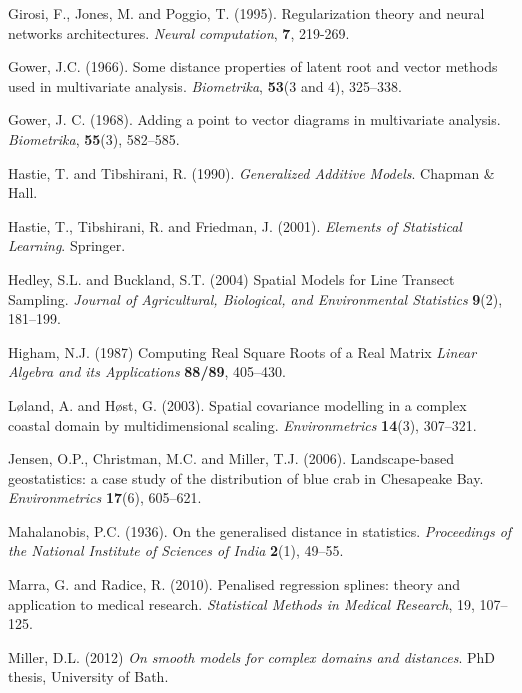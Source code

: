 \documentclass[useAMS, referee]{biom}
\begin{document}
\begin{thebibliography}{99}
\bibitem{} Girosi, F., Jones, M. and Poggio, T. (1995). Regularization theory and neural networks architectures. \textit{Neural computation}, \textbf{7}, 219-269.

\bibitem{} Gower, J.C. (1966). Some distance properties of latent root and vector methods used in multivariate analysis. \textit{Biometrika}, \textbf{53}(3 and 4), 325--338.

\bibitem{} Gower, J. C. (1968). Adding a point to vector diagrams in multivariate analysis. \textit{Biometrika}, \textbf{55}(3), 582--585.


\bibitem{} Hastie, T. and Tibshirani, R. (1990). \textit{Generalized Additive Models}. Chapman \& Hall.

\bibitem{} Hastie, T., Tibshirani, R. and Friedman, J. (2001). \textit{Elements of Statistical Learning}. Springer.

\bibitem{ } Hedley, S.L. and Buckland, S.T. (2004) Spatial Models for Line Transect Sampling. \textit{Journal of Agricultural, Biological, and Environmental Statistics} \textbf{9}(2), 181--199.

\bibitem{ } Higham, N.J. (1987) Computing Real Square Roots of a Real Matrix
 \textit{Linear Algebra and its Applications} \textbf{88/89}, 405--430.


\bibitem{} L{\o}land, A. and H{\o}st, G. (2003). Spatial covariance modelling in a complex coastal domain by multidimensional scaling. \textit{Environmetrics} \textbf{14}(3), 307--321.

\bibitem{} Jensen, O.P., Christman, M.C. and Miller, T.J. (2006). Landscape-based geostatistics: a case study of the distribution of blue crab in {C}hesapeake {B}ay. \textit{Environmetrics} \textbf{17}(6), 605--621.

\bibitem{} Mahalanobis, P.C. (1936). On the generalised distance in statistics. \textit{Proceedings of the National Institute of Sciences of India} \textbf{2}(1), 49--55.

\bibitem{} Marra, G. and Radice, R. (2010). Penalised regression splines: theory and application to medical research. \textit{Statistical Methods in Medical Research}, 19, 107--125.

\bibitem{} Miller, D.L. (2012) \textit{On smooth models for complex domains and distances}. PhD thesis, University of Bath.


\end{thebibliography}
\end{document}

